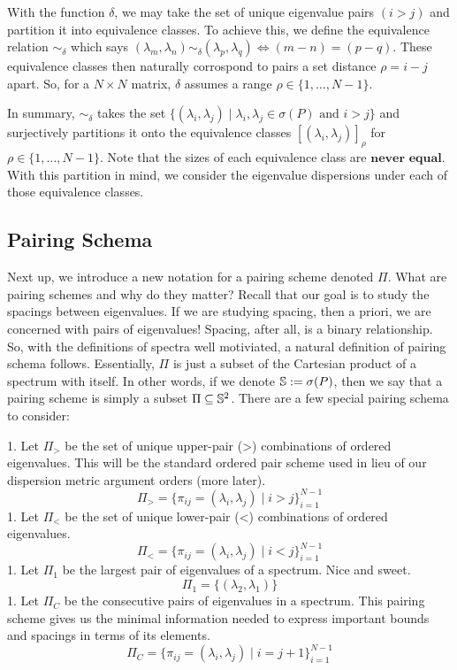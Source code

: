 With the function $\delta$, we may take the set of unique eigenvalue pairs $(i > j)$ and partition it into equivalence classes. To achieve this, we define the equivalence relation $\sim_\delta$ which says $(\lambda_m,\lambda_n) \sim_\delta (\lambda_p,\lambda_q) \iff (m -n) = (p-q)$. These equivalence classes then naturally corrospond to pairs a set distance $\rho = i - j$ apart. So, for a $N \times N$ matrix, $\delta$ assumes a range $\rho \in \{ 1,\dots,N-1\}$.

In summary, $\sim_\delta$ takes the set $\{(\lambda_i, \lambda_j) \mid \lambda_i, \lambda_j \in \sigma(P) \text{ and } i > j \}$ and surjectively partitions it onto the equivalence classes $[(\lambda_i, \lambda_j)]_\rho$ for $\rho \in \{ 1,\dots,N-1\}$. Note that the sizes of each equivalence class are $\textbf{never equal}$. With this partition in mind, we consider the eigenvalue dispersions under each of those equivalence classes.


\subsection{Pairing Schema}

Next up, we introduce a new notation for a pairing scheme denoted $\Pi$. What are pairing schemes and why do they matter? Recall that our goal is to study the spacings between eigenvalues. If we are studying spacing, then a priori, we are concerned with pairs of eigenvalues! Spacing, after all, is a binary relationship. So, with the definitions of spectra well motiviated, a natural definition of pairing schema follows. Essentially, $\Pi$ is just a subset of the Cartesian product of a spectrum with itself. In other words, if we denote $\S := \sigma(P)$, then we say that a pairing scheme is simply a subset $\Pi \subseteq \S^2$. There are a few special pairing schema to consider:

1. Let $\Pi_>$ be the set of unique upper-pair (>) combinations of ordered eigenvalues. This will be the standard ordered pair scheme used in lieu of our dispersion metric argument orders (more later).
$$\Pi_> = \{\pi_{ij} = (\lambda_i,\lambda_j) \mid i > j\}_{i = 1}^{N-1}$$
1. Let $\Pi_<$ be the set of unique lower-pair (<) combinations of ordered eigenvalues.
$$\Pi_< = \{\pi_{ij} = (\lambda_i,\lambda_j) \mid i < j\}_{i = 1}^{N-1}$$
1. Let $\Pi_1$ be the largest pair of eigenvalues of a spectrum. Nice and sweet.
$$\Pi_1 = \{(\lambda_2,\lambda_1)\}$$
1. Let $\Pi_C$ be the consecutive pairs of eigenvalues in a spectrum. This pairing scheme gives us the minimal information needed to express important bounds and spacings in terms of its elements.
$$\Pi_C = \{\pi_{ij} = (\lambda_i,\lambda_j) \mid i = j + 1\}_{i = 1}^{N-1}$$

